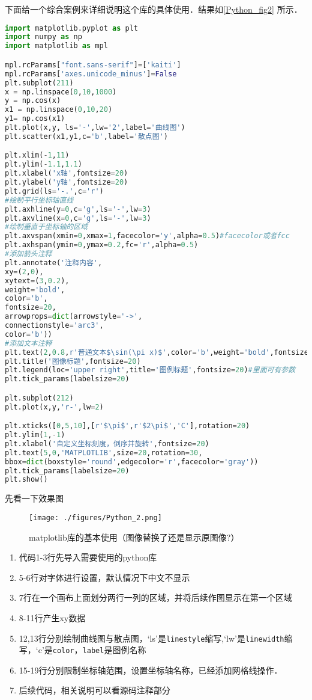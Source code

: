 下面给一个综合案例来详细说明这个库的具体使用．结果如\autoref{Python_fig2} 所示．
\begin{lstlisting}[language=python]
import matplotlib.pyplot as plt
import numpy as np
import matplotlib as mpl

mpl.rcParams["font.sans-serif"]=['kaiti']
mpl.rcParams['axes.unicode_minus']=False
plt.subplot(211)
x = np.linspace(0,10,1000)
y = np.cos(x)
x1 = np.linspace(0,10,20)
y1= np.cos(x1)
plt.plot(x,y, ls='-',lw='2',label='曲线图')
plt.scatter(x1,y1,c='b',label='散点图')

plt.xlim(-1,11)
plt.ylim(-1.1,1.1)
plt.xlabel('x轴',fontsize=20)
plt.ylabel('y轴',fontsize=20)
plt.grid(ls='-.',c='r')
#绘制平行坐标轴直线
plt.axhline(y=0,c='g',ls='-',lw=3)
plt.axvline(x=0,c='g',ls='-',lw=3)
#绘制垂直于坐标轴的区域
plt.axvspan(xmin=0,xmax=1,facecolor='y',alpha=0.5)#facecolor或者fcc
plt.axhspan(ymin=0,ymax=0.2,fc='r',alpha=0.5)
#添加箭头注释
plt.annotate('注释内容',
xy=(2,0),
xytext=(3,0.2),
weight='bold',
color='b',
fontsize=20,
arrowprops=dict(arrowstyle='->',
connectionstyle='arc3',
color='b'))
#添加文本注释
plt.text(2,0.8,r'普通文本$\sin(\pi x)$',color='b',weight='bold',fontsize=20)
plt.title('图像标题',fontsize=20)
plt.legend(loc='upper right',title='图例标题',fontsize=20)#里面可有参数
plt.tick_params(labelsize=20)

plt.subplot(212)
plt.plot(x,y,'r-',lw=2)

plt.xticks([0,5,10],[r'$\pi$',r'$2\pi$','C'],rotation=20)
plt.ylim(1,-1)
plt.xlabel('自定义坐标刻度，倒序并旋转',fontsize=20)
plt.text(5,0,'MATPLOTLIB',size=20,rotation=30,
bbox=dict(boxstyle='round',edgecolor='r',facecolor='gray'))
plt.tick_params(labelsize=20)
plt.show()
\end{lstlisting}
先看一下效果图

\begin{figure}[ht]
\centering
\texttt{[image: ./figures/Python\_2.png]}
\caption{matplotlib库的基本使用（图像替换了还是显示原图像?）} \label{Python_fig2}
\end{figure}

\begin{enumerate}
\item 代码1-3行先导入需要使用的python库
\item 5-6行对字体进行设置，默认情况下中文不显示
\item 7行在一个画布上面划分两行一列的区域，并将后续作图显示在第一个区域
\item 8-11行产生xy数据
\item 12,13行分别绘制曲线图与散点图，‘ls’是\verb|linestyle|缩写,‘lw’是\verb|linewidth|缩写，‘c’是\verb|color|，\verb|label|是图例名称
\item 15-19行分别限制坐标轴范围，设置坐标轴名称，已经添加网格线操作．
\item 后续代码，相关说明可以看源码注释部分
\end{enumerate}

